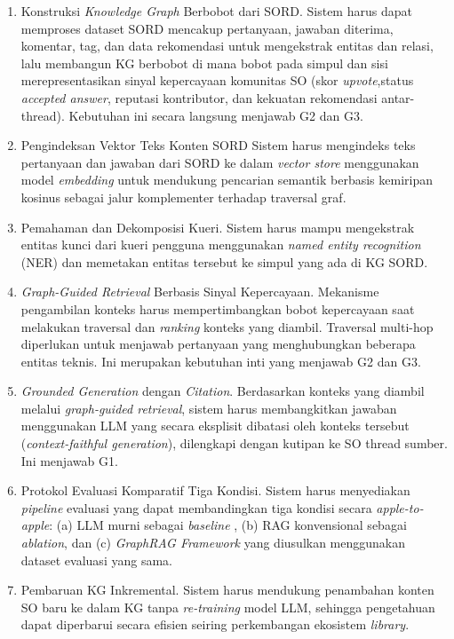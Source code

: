 \begin{enumerate}[label=\textbf{F\arabic*.}]
    \item Konstruksi \emph{Knowledge Graph} Berbobot dari SORD.
    Sistem harus dapat memproses dataset SORD mencakup pertanyaan, jawaban diterima, komentar, tag, dan data rekomendasi untuk mengekstrak entitas dan relasi, lalu membangun KG berbobot di mana bobot pada simpul dan sisi merepresentasikan sinyal kepercayaan komunitas SO (skor \emph{upvote},status \emph{accepted answer}, reputasi kontributor, dan kekuatan rekomendasi antar-thread). Kebutuhan ini secara langsung menjawab G2 dan G3.

    \item Pengindeksan Vektor Teks Konten SORD
    Sistem harus mengindeks teks pertanyaan dan jawaban dari SORD ke dalam \emph{vector store} menggunakan model \emph{embedding} untuk mendukung pencarian semantik berbasis kemiripan kosinus sebagai jalur komplementer terhadap traversal graf.

    \item Pemahaman dan Dekomposisi Kueri.
    Sistem harus mampu mengekstrak entitas kunci dari kueri pengguna menggunakan \emph{named entity recognition} (NER) dan memetakan entitas tersebut ke simpul yang ada di KG SORD.

    \item \emph{Graph-Guided Retrieval} Berbasis Sinyal Kepercayaan.
    Mekanisme pengambilan konteks harus mempertimbangkan bobot kepercayaan saat melakukan traversal dan \emph{ranking} konteks yang diambil. Traversal multi-hop diperlukan untuk menjawab pertanyaan yang menghubungkan beberapa entitas teknis. Ini merupakan kebutuhan inti yang menjawab G2 dan G3.

    \item \emph{Grounded Generation} dengan \emph{Citation}.
    Berdasarkan konteks yang diambil melalui \emph{graph-guided retrieval}, sistem harus membangkitkan jawaban menggunakan LLM yang secara eksplisit dibatasi oleh konteks tersebut (\emph{context-faithful generation}), dilengkapi dengan kutipan ke SO thread sumber. Ini menjawab G1.

    \item Protokol Evaluasi Komparatif Tiga Kondisi.
    Sistem harus menyediakan \emph{pipeline} evaluasi yang dapat membandingkan tiga kondisi secara \emph{apple-to-apple}: (a) LLM murni
    sebagai \emph{baseline} \autocite{DaSilva2025}, (b) RAG konvensional sebagai \emph{ablation}, dan (c) \emph{GraphRAG Framework} yang diusulkan menggunakan dataset evaluasi yang sama.

    \item Pembaruan KG Inkremental.
    Sistem harus mendukung penambahan konten SO baru ke dalam KG tanpa \emph{re-training} model LLM, sehingga pengetahuan dapat diperbarui secara efisien seiring perkembangan ekosistem \emph{library}.
\end{enumerate}

